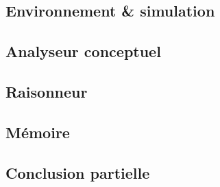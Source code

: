 \subsection{Environnement \& simulation}


\subsection{Analyseur conceptuel}


\subsection{Raisonneur}


\subsection{Mémoire}


\subsection{Conclusion partielle}

